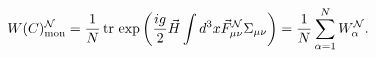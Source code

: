 \begin{equation}
\label{WcalN}
W(C)_{\rm mon}^{\cal N}=\frac{1}{N}{\,}{\rm tr}{\,}\exp\left(\frac{ig}{2}\vec H\int d^3x\vec F_{\mu\nu}^{\cal N}\Sigma_{\mu\nu}\right)=
\frac{1}{N}\sum\limits_{\alpha=1}^{N}W_\alpha^{\cal N}.
\end{equation}


